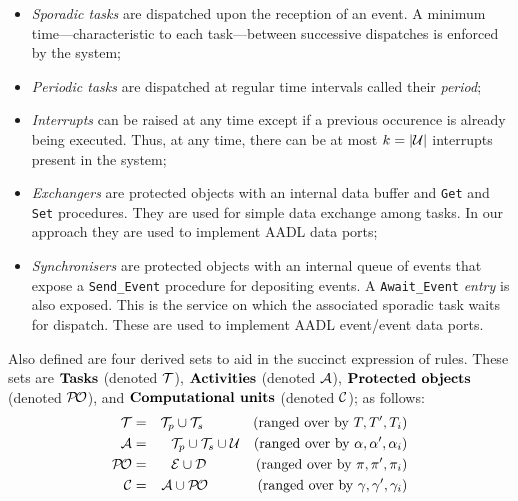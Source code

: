 \begin{itemize}
  \item{\emph{Sporadic tasks} are dispatched upon the reception of an
    event. A minimum time---characteristic to each task---between
    successive dispatches is enforced by the system;}
  \item{\emph{Periodic tasks} are dispatched at regular time intervals
    called their \emph{period};}
  \item{\emph{Interrupts} can be raised at any time except if a
    previous occurence is already being executed. Thus, at any time,
    there can be at most ${k=|\cal U|}$ interrupts present in the
    system;}
  \item{\emph{Exchangers} are protected objects with an internal data
    buffer and \texttt{Get} and \texttt{Set} procedures. They are used
    for simple data exchange among tasks. In our approach they are used
    to implement AADL data ports;}
  \item{\emph{Synchronisers} are protected objects with an internal
    queue of events that expose a \texttt{Send\_Event} procedure for
    depositing events. A \texttt{Await\_Event} \emph{entry} is also
    exposed. This is the service on which the associated sporadic task
    waits for dispatch. These are used to implement AADL event/event data
    ports.}
\end{itemize}

Also defined are four derived sets to aid in the succinct expression
of rules. These sets are $\text{\textbf{Tasks}}$ (denoted ${\cal T}$),
$\text{\textbf{Activities}}$ (denoted ${\cal A}$),
$\text{\textbf{Protected objects}}$ (denoted ${\cal P\!O}$), and
$\text{\textbf{Computational units}}$ (denoted ${\cal C}$); as
follows:
\begin{eqnarray}
  {\cal T} & = & {\cal T}_p\cup {\cal T}_s
  \ \ \ \ \ \ \ \ \ \ \: \text{(ranged over by} \ T, T', T_i \text{)} \nonumber \\
  {\cal A}  & =  & \, {\cal T}_p\cup {\cal T}_s \cup
  {\cal U} \ \ \ \text{(ranged over by} \ \alpha, \alpha',
  \alpha_i \text{)} \nonumber \\
  {\cal P\!O} & = & \ \, 
  {\cal E} \cup {\cal D} \ \ \ \ \ \: \ \ \ \ \ \text{(ranged over by} \ \pi, \pi',
  \pi_i \nonumber \text{)} \\
{\cal C} & = & {\cal A}
  \cup {\cal P\!O} \ \ \ \ \ \: \ \ \ \ \ \text{(ranged over by} \ \gamma, \gamma',
  \gamma_i \text{)} \nonumber
\end{eqnarray}

